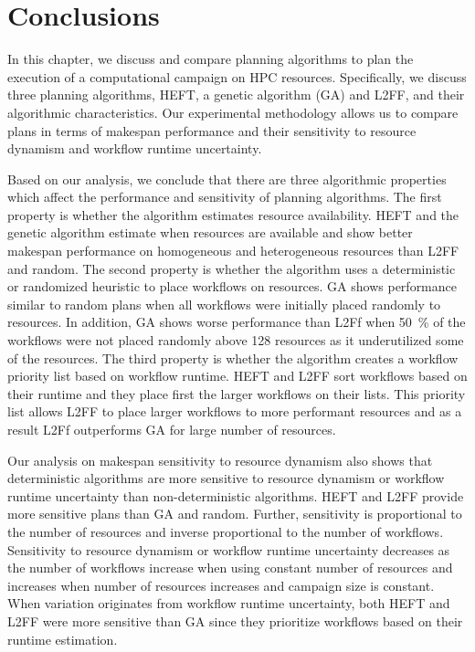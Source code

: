 \section{Conclusions}
\label{sec:cf_algo_sel}
In this chapter, we discuss and compare planning algorithms to plan the
execution of a computational campaign on HPC resources. Specifically, we
discuss three planning algorithms, HEFT, a genetic algorithm (GA) and L2FF,
and their algorithmic characteristics. Our experimental methodology allows us
to compare plans in terms of makespan performance and their sensitivity to
resource dynamism and workflow runtime uncertainty.

Based on our analysis, we conclude that there are three algorithmic properties
which affect the performance and sensitivity of planning algorithms. The first
property is whether the algorithm estimates resource availability. HEFT and
the genetic algorithm estimate when resources are available and show better
makespan performance on homogeneous and heterogeneous resources than L2FF and
random. The second property is whether the algorithm uses a deterministic or
randomized heuristic to place workflows on resources. GA shows performance
similar to random plans when all workflows were initially placed randomly to
resources. In addition, GA shows worse performance than L2Ff when 50~\% of the
workflows were not placed randomly above 128 resources as it underutilized
some of the resources. The third property is whether the algorithm creates a
workflow priority list based on workflow runtime. HEFT and L2FF sort workflows
based on their runtime and they place first the larger workflows on their
lists. This priority list allows L2FF to place larger workflows to more
performant resources and as a result L2Ff outperforms GA for large number of
resources.

Our analysis on makespan sensitivity to resource dynamism also shows that
deterministic algorithms are more sensitive to resource dynamism or workflow
runtime uncertainty than non-deterministic algorithms. HEFT and L2FF provide
more sensitive plans than GA and random. Further, sensitivity is proportional
to the number of resources and inverse proportional to the number of workflows.
Sensitivity to resource dynamism or workflow runtime uncertainty decreases as
the number of workflows increase when using constant number of resources and
increases when number of resources increases and campaign size is constant.
When variation originates from workflow runtime uncertainty, both HEFT and
L2FF were more sensitive than GA since they prioritize workflows based on
their runtime estimation.

